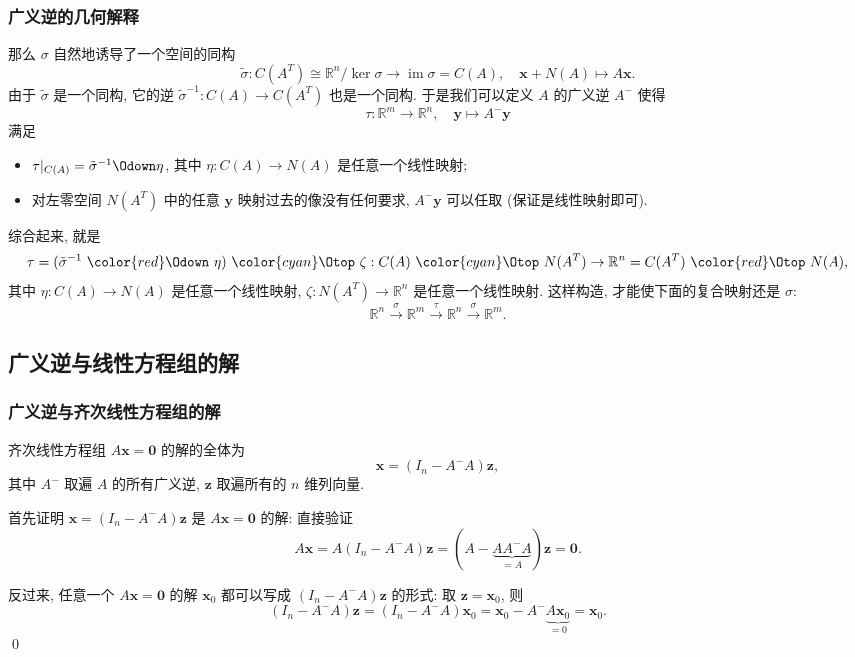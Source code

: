 \begin{frame}
\frametitle{广义逆的几何解释}

那么 $\sigma$ 自然地诱导了一个空间的同构
\[
\tilde{\sigma}: C(A^T) \cong \mathbb{R}^n / \ker \sigma \to \operatorname{im} \sigma = C(A), \quad \mathbf{x} + N(A) \mapsto A\mathbf{x}.
\]
由于 $\tilde{\sigma}$ 是一个同构, 它的逆 $\tilde{\sigma}^{-1}: C(A) \to C(A^T)$ 也是一个同构. 于是我们可以定义 $A$ 的广义逆 $A^-$ 使得
\[
\tau: \mathbb{R}^m \to \mathbb{R}^n, \quad \mathbf{y} \mapsto A^-\mathbf{y}
\]
满足
\begin{itemize}
\item $\tau|_{C(A)} = \tilde{\sigma}^{-1} \Odown \eta$, 其中 $\eta: C(A) \to N(A)$ 是任意一个线性映射;
\item 对左零空间 $N(A^T)$ 中的任意 $\mathbf{y}$ 映射过去的像没有任何要求, $A^-\mathbf{y}$ 可以任取 (保证是线性映射即可).
\end{itemize}
综合起来, 就是
\[
\tau = (\tilde{\sigma}^{-1} ~ {\color{red}\Odown} ~ \eta) ~ {\color{cyan}\Otop} ~ \zeta : C(A) ~ {\color{cyan}\Otop} ~ N(A^T) \to \mathbb{R}^n = C(A^T) ~ {\color{red}\Otop} ~ N(A),
\]
其中 $\eta: C(A) \to N(A)$ 是任意一个线性映射, $\zeta: N(A^T) \to \mathbb{R}^n$ 是任意一个线性映射. 这样构造, 才能使下面的复合映射还是 $\sigma:$
\[
\mathbb{R}^n \xrightarrow{\sigma} \mathbb{R}^m \xrightarrow{\tau} \mathbb{R}^n \xrightarrow{\sigma} \mathbb{R}^m.
\]


\end{frame}


\subsection{广义逆与线性方程组的解}


\begin{frame}
\frametitle{广义逆与齐次线性方程组的解}

\begin{prop}[广义逆与齐次线性方程组]
齐次线性方程组 $A\mathbf{x} = \mathbf{0}$ 的解的全体为
\[\mathbf{x} = (I_n - A^-A)\mathbf{z},\]
其中 $A^-$ 取遍 $A$ 的所有广义逆, $\mathbf{z}$ 取遍所有的 $n$ 维列向量.
\end{prop}

\pause
\vspace{1em}

 首先证明 $\mathbf{x} = (I_n - A^-A)\mathbf{z}$ 是 $A\mathbf{x} = \mathbf{0}$ 的解: 直接验证
\[
A\mathbf{x} = A(I_n - A^-A)\mathbf{z} = (A - \underbrace{AA^-A}_{=A})\mathbf{z} = \mathbf{0}.
\]

\pause
\vspace{0.5em}

{\color{red}} 反过来, 任意一个 $A\mathbf{x} = \mathbf{0}$ 的解 $\mathbf{x}_0$ 都可以写成 $(I_n - A^-A)\mathbf{z}$ 的形式: 取 $\mathbf{z} = \mathbf{x}_0$, 则
\[
(I_n - A^-A)\mathbf{z} = (I_n - A^-A)\mathbf{x}_0 = \mathbf{x}_0 - A^- \underbrace{A\mathbf{x}_0}_{=0} = \mathbf{x}_0.
\]
\qed

\end{frame}

